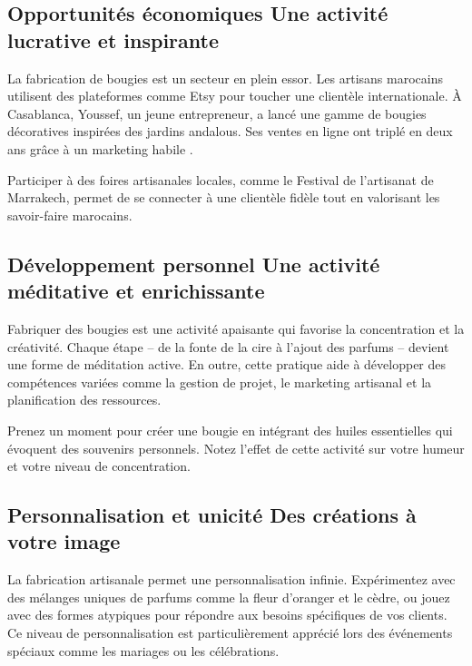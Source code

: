\documentclass[11pt,fleqn,onecolumn,oneside]{book}
\begin{document}
\subsection*{Opportunités économiques Une activité lucrative et inspirante}

La fabrication de bougies est un secteur en plein essor. Les artisans marocains utilisent des plateformes comme Etsy pour toucher une clientèle internationale. À Casablanca, Youssef, un jeune entrepreneur, a lancé une gamme de bougies décoratives inspirées des jardins andalous. Ses ventes en ligne ont triplé en deux ans grâce à un marketing habile \cite{etsy2024}.

\begin{remark}
Participer à des foires artisanales locales, comme le Festival de l’artisanat de Marrakech, permet de se connecter à une clientèle fidèle tout en valorisant les savoir-faire marocains.
\end{remark}

\subsection*{Développement personnel Une activité méditative et enrichissante}

Fabriquer des bougies est une activité apaisante qui favorise la concentration et la créativité. Chaque étape – de la fonte de la cire à l’ajout des parfums – devient une forme de méditation active. En outre, cette pratique aide à développer des compétences variées comme la gestion de projet, le marketing artisanal et la planification des ressources.

\begin{exercise}
Prenez un moment pour créer une bougie en intégrant des huiles essentielles qui évoquent des souvenirs personnels. Notez l’effet de cette activité sur votre humeur et votre niveau de concentration.
\end{exercise}

\subsection*{Personnalisation et unicité Des créations à votre image}

La fabrication artisanale permet une personnalisation infinie. Expérimentez avec des mélanges uniques de parfums comme la fleur d’oranger et le cèdre, ou jouez avec des formes atypiques pour répondre aux besoins spécifiques de vos clients. Ce niveau de personnalisation est particulièrement apprécié lors des événements spéciaux comme les mariages ou les célébrations.
\end{document}

